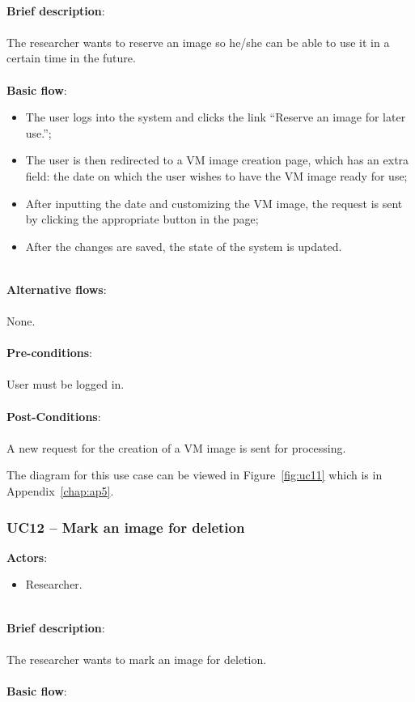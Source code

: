 \ \\
\textbf{Brief description}:\\
\ \\
The researcher wants to reserve an image so he/she can be able to use it in a certain time in the future.\\
\ \\
\textbf{Basic flow}:

\begin{itemize}
\item The user logs into the system and clicks the link ``Reserve an image for later use.'';
\item The user is then redirected to a VM image creation page, which has an extra field: the date on which the user wishes to have the VM image ready for use;
\item After inputting the date and customizing the VM image, the request is sent by clicking the appropriate button in the page;
\item After the changes are saved, the state of the system is updated.
\end{itemize}

\ \\
\textbf{Alternative flows}:\\
\ \\
None.\\
\ \\
\textbf{Pre-conditions}:\\
\ \\
User must be logged in.\\
\ \\
\textbf{Post-Conditions}:\\
\ \\
A new request for the creation of a VM image is sent for processing.

The diagram for this use case can be viewed in Figure~\ref{fig:uc11} which is in Appendix~\ref{chap:ap5}.

\subsubsection{UC12 -- Mark an image for deletion}\label{uc12}

\textbf{Actors}:

\begin{itemize}
\item Researcher.
\end{itemize}

\ \\
\textbf{Brief description}:\\
\ \\
The researcher wants to mark an image for deletion.\\
\ \\
\textbf{Basic flow}:

